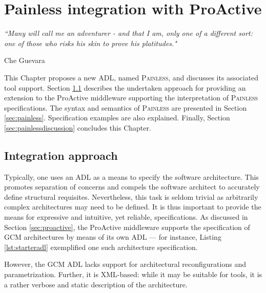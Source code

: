 
\chapter{\textsf{Painless} integration with ProActive} 
\label{chap:extraction} 


\epigraph{\textit{“Many will call me an adventurer - and that I am, only one of a different sort: 
                             one of those who risks his skin to prove his platitudes."}}{Che Guevara}



\minitoc



	This Chapter proposes a new \ac{ADL}, named \textsc{Painless}, and discusses its associated tool support.
	Section \ref{sec:painlessapproach} describes the undertaken approach for providing an
	extension to the ProActive middleware supporting the interpretation of 
	\textsc{Painless} specifications.
	The syntax and semantics of \textsc{Painless} are presented in Section \ref{sec:painless}. Specification
	examples are also explained. Finally, Section \ref{sec:painlessdiscussion} concludes this Chapter.



\section{Integration approach}
\label{sec:painlessapproach}

	
		Typically, one uses an \ac{ADL} as a means to specify the 
	software architecture. This promotes separation of concerns
	and compels the software architect to accurately define structural requisites. Nevertheless,
	this task is seldom trivial as arbitrarily complex architectures may need to be defined.
	It is thus important to provide the means for expressive and intuitive, yet reliable, specifications.	
	As discussed in Section \ref{sec:proactive}, the ProActive middleware supports the specification
	of \ac{GCM} architectures by means of its own \ac{ADL} --- for instance, Listing \ref{lst:starteradl}
	exemplified one such architecture specification.
				
	 However, the \ac{GCM} \ac{ADL} lacks support for architectural
	reconfigurations and parametrization. Further, it is XML-based: while it may be suitable
	for tools, it is a rather verbose and static description of the architecture.
		
